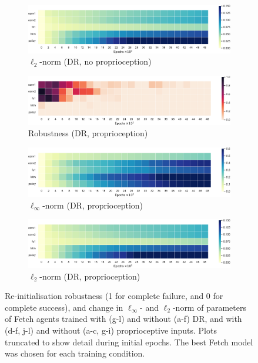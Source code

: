 \begin{figure}
\begin{subfigure}{0.32\textwidth}
    \includegraphics[width=\textwidth]{figures/chapter6/robustness/fetch/visual_random/l2_dist}
    \caption{$\ell_2$-norm (DR, no proprioception)}
  \end{subfigure}
  \begin{subfigure}{0.32\textwidth}
    \includegraphics[width=\textwidth]{figures/chapter6/robustness/fetch/sensor_random/error}
    \caption{Robustness (DR, proprioception)}
  \end{subfigure}
  \begin{subfigure}{0.32\textwidth}
    \includegraphics[width=\textwidth]{figures/chapter6/robustness/fetch/sensor_random/inf_dist}
    \caption{$\ell_\infty$-norm (DR, proprioception)}
  \end{subfigure}
  \begin{subfigure}{0.32\textwidth}
    \includegraphics[width=\textwidth]{figures/chapter6/robustness/fetch/sensor_random/l2_dist}
    \caption{$\ell_2$-norm (DR, proprioception)}
  \end{subfigure}
  \caption{Re-initialisation robustness (1 for complete failure, and 0 for complete success), and change in $\ell_\infty$- and $\ell_2$-norm of parameters of Fetch agents trained with (g-l) and without (a-f) DR, and with (d-f, j-l) and without (a-c, g-i) proprioceptive inputs. Plots truncated to show detail during initial epochs. The best Fetch model was chosen for each training condition.}
  \label{fig:fetch_robustness}
\end{figure}

